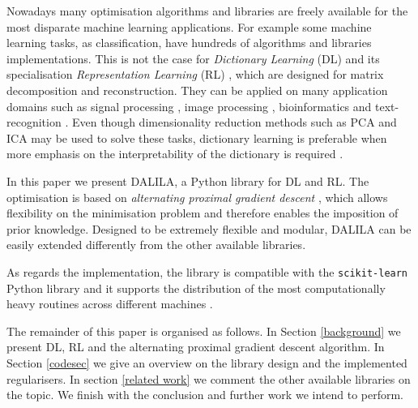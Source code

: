 \documentclass[a4paper,UKenglish]{oasics}
\begin{document}
Nowadays many optimisation algorithms and libraries are freely available for the most disparate machine learning applications. For example some machine learning tasks, as classification, have hundreds of algorithms and libraries implementations. This is not the case for \emph{Dictionary Learning} (DL) \cite{lee1999learning, lin2007,  Mairal2010, mairal2009supervised,  rakotomamonjy2013direct, salzo2014alternating, tosic2011dictionary} and its specialisation \emph{Representation Learning} (RL) \cite{6472238, 4385788}, which are designed for matrix decomposition and reconstruction.
They can be applied on many application domains such as signal processing \cite{tosic2011dictionary}, image processing \cite{ravishankar2011mr}, bioinformatics \cite{alexandrov2013deciphering} and text-recognition \cite{aggarwal2012mining}. Even though dimensionality reduction methods such as PCA \cite{jolliffe2002principal} and ICA \cite{hyvarinen2004independent} may be used to solve these tasks, dictionary learning is preferable when more emphasis on the interpretability of the dictionary is required  \cite{lee1999learning}. %

In this paper we present DALILA, a Python library for DL and RL. The optimisation is based on \emph{alternating proximal gradient descent} \cite{bolte2014proximal}, which allows flexibility on the minimisation problem and therefore enables the imposition of prior knowledge.
Designed to be extremely flexible and modular, DALILA can be easily extended differently from the other available libraries.

As regards the implementation, the library is compatible with the \texttt{scikit-learn} Python library and it supports the distribution of the most computationally heavy routines across different machines \cite{dask}.%

The remainder of this paper is organised as follows. In Section \ref{background} we present DL, RL and the alternating proximal gradient descent algorithm. In Section \ref{codesec} we give an overview on the library design and the implemented regularisers. In section \ref{related work} we comment the other available libraries on the topic. We finish with the conclusion and further work we intend to perform.
\end{document}
